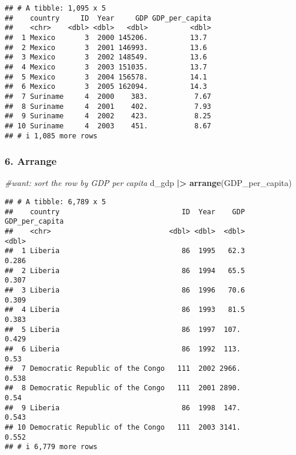 \documentclass[
]{article}
\newenvironment{Shaded}{\begin{snugshade}}{\end{snugshade}}
\newcommand{\CommentTok}[1]{\textcolor[rgb]{0.56,0.35,0.01}{\textit{#1}}}
\newcommand{\FunctionTok}[1]{\textcolor[rgb]{0.13,0.29,0.53}{\textbf{#1}}}
\newcommand{\NormalTok}[1]{#1}
\newcommand{\SpecialCharTok}[1]{\textcolor[rgb]{0.81,0.36,0.00}{\textbf{#1}}}
\begin{document}
\begin{verbatim}
## # A tibble: 1,095 x 5
##    country     ID  Year     GDP GDP_per_capita
##    <chr>    <dbl> <dbl>   <dbl>          <dbl>
##  1 Mexico       3  2000 145206.          13.7 
##  2 Mexico       3  2001 146993.          13.6 
##  3 Mexico       3  2002 148549.          13.6 
##  4 Mexico       3  2003 151035.          13.7 
##  5 Mexico       3  2004 156578.          14.1 
##  6 Mexico       3  2005 162094.          14.3 
##  7 Suriname     4  2000    383.           7.67
##  8 Suriname     4  2001    402.           7.93
##  9 Suriname     4  2002    423.           8.25
## 10 Suriname     4  2003    451.           8.67
## # i 1,085 more rows
\end{verbatim}

\hypertarget{arrange}{%
\subsubsection{6. Arrange}\label{arrange}}

\begin{Shaded}
\begin{Highlighting}[]
\CommentTok{\#want: sort the row by GDP per capita}
\NormalTok{d\_gdp }\SpecialCharTok{|\textgreater{}} \FunctionTok{arrange}\NormalTok{(GDP\_per\_capita)}
\end{Highlighting}
\end{Shaded}

\begin{verbatim}
## # A tibble: 6,789 x 5
##    country                             ID  Year    GDP GDP_per_capita
##    <chr>                            <dbl> <dbl>  <dbl>          <dbl>
##  1 Liberia                             86  1995   62.3          0.286
##  2 Liberia                             86  1994   65.5          0.307
##  3 Liberia                             86  1996   70.6          0.309
##  4 Liberia                             86  1993   81.5          0.383
##  5 Liberia                             86  1997  107.           0.429
##  6 Liberia                             86  1992  113.           0.53 
##  7 Democratic Republic of the Congo   111  2002 2966.           0.538
##  8 Democratic Republic of the Congo   111  2001 2890.           0.54 
##  9 Liberia                             86  1998  147.           0.543
## 10 Democratic Republic of the Congo   111  2003 3141.           0.552
## # i 6,779 more rows
\end{verbatim}
\end{document}
